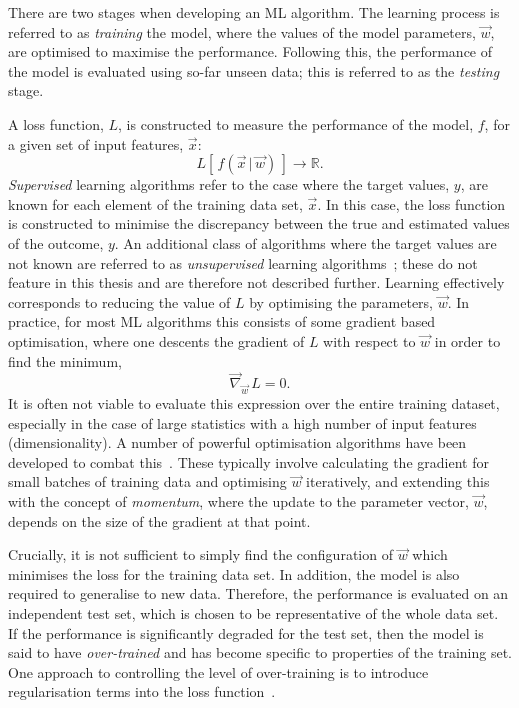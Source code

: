 There are two stages when developing an ML algorithm. The learning process is referred to as \textit{training} the model, where the values of the model parameters, $\vec{w}$, are optimised to maximise the performance. Following this, the performance of the model is evaluated using so-far unseen data; this is referred to as the \textit{testing} stage.

A loss function, $L$, is constructed to measure the performance of the model, $f$, for a given set of input features, $\vec{x}$:
\begin{equation}
    L[\,f(\vec{x}\,|\,\vec{w})\,] \rightarrow \mathbb{R}.
\end{equation}
\noindent
\textit{Supervised} learning algorithms refer to the case where the target values, $y$, are known for each element of the training data set, $\vec{x}$. In this case, the loss function is constructed to minimise the discrepancy between the true and estimated values of the outcome, $y$. An additional class of algorithms where the target values are not known are referred to as \textit{unsupervised} learning algorithms~\cite{10.5555/3086952}; these do not feature in this thesis and are therefore not described further. Learning effectively corresponds to reducing the value of $L$ by optimising the parameters, $\vec{w}$. In practice, for most ML algorithms this consists of some gradient based optimisation, where one descents the gradient of $L$ with respect to $\vec{w}$ in order to find the minimum,
\begin{equation}\label{eq:loss_minimum}
    \vec{\nabla}_{\vec{w}}\,L = 0.
\end{equation}
\noindent
It is often not viable to evaluate this expression over the entire training dataset, especially in the case of large statistics with a high number of input features (dimensionality). A number of powerful optimisation algorithms have been developed to combat this~\cite{10.5555/3086952,pmlr-v28-sutskever13,kingma2017adam}. These typically involve calculating the gradient for small batches of training data and optimising $\vec{w}$ iteratively, and extending this with the concept of \textit{momentum}, where the update to the parameter vector, $\vec{w}$, depends on the size of the gradient at that point.

Crucially, it is not sufficient to simply find the configuration of $\vec{w}$ which minimises the loss for the training data set. In addition, the model is also required to generalise to new data. Therefore, the performance is evaluated on an independent test set, which is chosen to be representative of the whole data set. If the performance is significantly degraded for the test set, then the model is said to have \textit{over-trained} and has become specific to properties of the training set. One approach to controlling the level of over-training is to introduce regularisation terms into the loss function~\cite{10.5555/3086952}.

